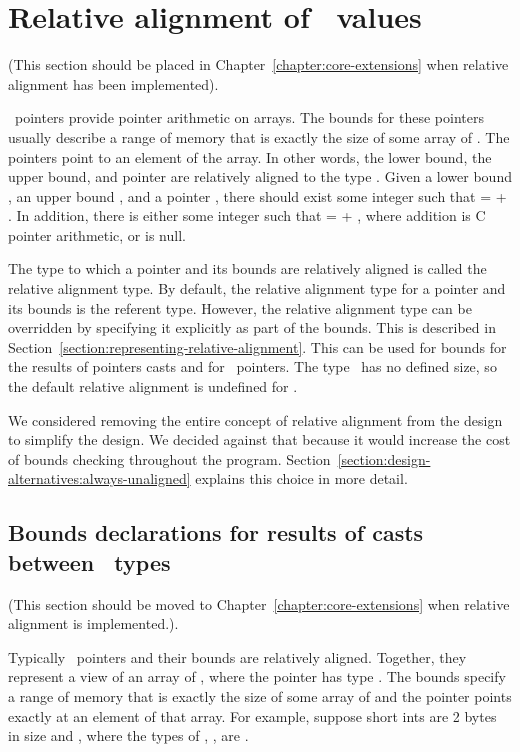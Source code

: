 \section{Relative alignment of \arrayptr\ values}
\label{section:relative-alignment}

(This section should be placed in Chapter~{\ref{chapter:core-extensions}}
when relative alignment has been implemented).

\arrayptrT\ pointers provide
pointer arithmetic on arrays. The bounds for these pointers usually
describe a range of memory that is exactly the size of some array of .
The pointers point to an element of the array. In other words, the lower
bound, the upper bound, and pointer are  relatively aligned to the type
. Given a lower bound , an upper bound , and a
pointer , there should exist some integer  such that
 =  + . In addition, there is either some
integer  such that  =  + ,
where addition is C pointer arithmetic, or  is null.

The type to which a pointer and its bounds are relatively aligned is
called the relative alignment type. By default, the relative alignment
type for a pointer and its bounds is the referent type. However, the
relative alignment type can be overridden by specifying it explicitly as
part of the bounds.  This is described in
Section~\ref{section:representing-relative-alignment}.
This can be used for bounds for the results of pointers casts and
for  \arrayptrvoid\ pointers. The type
\void\ has no defined size, so the default relative alignment is
undefined for \void.

We considered removing the entire concept of relative alignment from the
design to simplify the design.  We decided against that because it would
increase the cost of bounds checking throughout the program.
Section~\ref{section:design-alternatives:always-unaligned} explains
this choice in more detail.

\subsection{Bounds declarations for results of casts between \plainarrayptr\ types}
\label{section:pointer-cast-results}

(This section should be moved to Chapter~\ref{chapter:core-extensions} when
relative alignment is implemented.).

Typically \arrayptr\ pointers and their bounds are relatively
aligned. Together, they represent a view of an array of , where
the pointer has type
\arrayptrT. The
bounds specify a range of memory that is exactly the size of some array
of  and the pointer points exactly at an element of that array. For
example, suppose short ints are 2 bytes in size and
{}, where the types of ,
,  are  .


